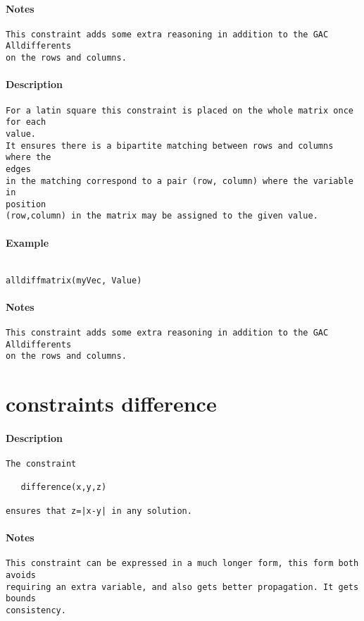 \paragraph{Notes}
{\footnotesize
\begin{verbatim}
This constraint adds some extra reasoning in addition to the GAC Alldifferents
on the rows and columns.
\end{verbatim}
}
\paragraph{Description}
{\footnotesize
\begin{verbatim}
For a latin square this constraint is placed on the whole matrix once for each
value.
It ensures there is a bipartite matching between rows and columns where the
edges
in the matching correspond to a pair (row, column) where the variable in
position
(row,column) in the matrix may be assigned to the given value.
\end{verbatim}
}
\paragraph{Example}
{\footnotesize
\begin{verbatim}

alldiffmatrix(myVec, Value)
\end{verbatim}
}
\paragraph{Notes}
{\footnotesize
\begin{verbatim}
This constraint adds some extra reasoning in addition to the GAC Alldifferents
on the rows and columns.
\end{verbatim}
}
\section{constraints difference}
\paragraph{Description}
{\footnotesize
\begin{verbatim}
The constraint

   difference(x,y,z)

ensures that z=|x-y| in any solution.
\end{verbatim}
}
\paragraph{Notes}
{\footnotesize
\begin{verbatim}
This constraint can be expressed in a much longer form, this form both avoids
requiring an extra variable, and also gets better propagation. It gets bounds
consistency.
\end{verbatim}
}
